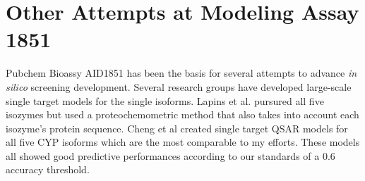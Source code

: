 



\section{Other Attempts at Modeling Assay 1851}
Pubchem Bioassy AID1851 has been the basis for several attempts to advance \textit{in silico} screening development. Several research groups have developed large-scale single target models for the single isoforms. \cite{Vasanthanathan2009, Sridhar2012, Sun2012, Novotarskyi2010} Lapins et al. pursured all five isozymes but used a proteochemometric method that also takes into account each isozyme's protein sequence. \cite{Lapins2013} Cheng et al created single target QSAR models for all five CYP isoforms which are the most comparable to my efforts. \cite{Cheng2011} These models all showed good predictive performances according to our standards of a 0.6 accuracy threshold.

